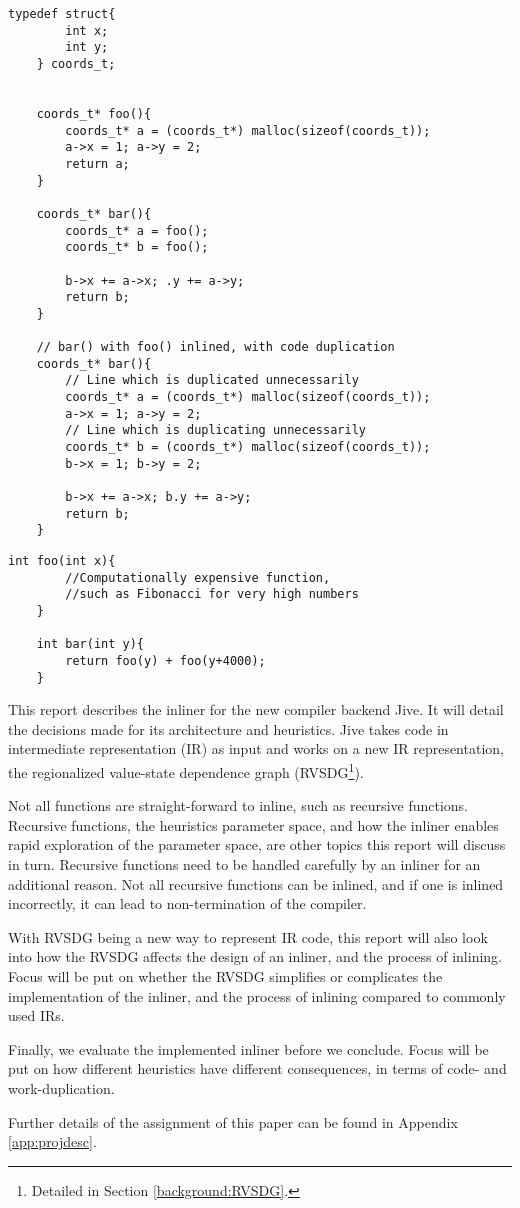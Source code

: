 \begin{lstlisting}[caption={Code duplication through inlining},
label={lst:code-dup}, style=customcpp]
	typedef struct{
		int x;
		int y;
	} coords_t;


	coords_t* foo(){
		coords_t* a = (coords_t*) malloc(sizeof(coords_t));
		a->x = 1; a->y = 2;
		return a;
	}

	coords_t* bar(){
		coords_t* a = foo();
		coords_t* b = foo();

		b->x += a->x; .y += a->y;
		return b;
	}

	// bar() with foo() inlined, with code duplication
	coords_t* bar(){
		// Line which is duplicated unnecessarily
		coords_t* a = (coords_t*) malloc(sizeof(coords_t));
		a->x = 1; a->y = 2;
		// Line which is duplicating unnecessarily
		coords_t* b = (coords_t*) malloc(sizeof(coords_t));
		b->x = 1; b->y = 2;

		b->x += a->x; b.y += a->y;
		return b;
	}
\end{lstlisting}
\begin{lstlisting}[caption={Work duplication if inlined},
label={lst:work-dup}, style=customcpp]
	int foo(int x){
		//Computationally expensive function,
		//such as Fibonacci for very high numbers
	}

	int bar(int y){
		return foo(y) + foo(y+4000);
	}
\end{lstlisting}


This report describes the inliner for the new compiler backend Jive. It will
detail the decisions made for its architecture and heuristics. Jive takes code
in intermediate representation (IR) as input and works on a new IR
representation, the regionalized value-state dependence graph
(RVSDG\footnote{Detailed in Section \ref{background:RVSDG}.}).

Not all functions are straight-forward to inline, such as recursive functions.
Recursive functions, the heuristics parameter space, and how the inliner enables
rapid exploration of the parameter space, are other topics this report will
discuss in turn. Recursive functions need to be handled carefully by an inliner
for an additional reason. Not all recursive functions can be inlined, and if one
is inlined incorrectly, it can lead to non-termination of the compiler.

With RVSDG being a new way to represent IR code, this report will also look into
how the RVSDG affects the design of an inliner, and the process of inlining.
Focus will be put on whether the RVSDG simplifies or complicates the
implementation of the inliner, and the process of inlining compared to commonly
used IRs.

Finally, we evaluate the implemented inliner before we conclude. Focus will be
put on how different heuristics have different consequences, in terms of code-
and work-duplication.

Further details of the assignment of this paper can be found in Appendix
\ref{app:projdesc}.
